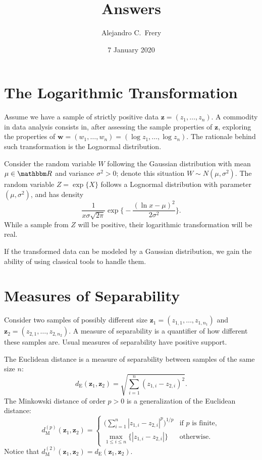 \documentclass[12pt]{article}
\title{Answers}
\author{Alejandro C.\ Frery}
\date{7 January 2020}
\begin{document}
\maketitle

\section{The Logarithmic Transformation}

Assume we have a sample of strictly positive data $\bm z=(z_1,\dots,z_n)$.
A commodity in data analysis consists in, after assessing the sample properties of $\bm z$, exploring the properties of $\bm w = (w_1,\dots,w_n)=(\log z_1,\dots,\log z_n)$.
The rationale behind such transformation is the Lognormal distribution.

Consider the random variable $W$ following the Gaussian distribution with mean $\mu\in\mathbbm R$ and variance $\sigma^2>0$; denote this situation $W\sim N(\mu,\sigma^2)$.
The random variable $Z=\exp \{X\}$ follows a Lognormal distribution with parameter $(\mu,\sigma^2)$, and has density
\begin{equation}
\frac {1}{x\sigma {\sqrt {2\pi }}}
 \exp \Big\{-\frac {\left(\ln x-\mu \right)^{2}}{2\sigma ^{2}}\Big\}.
\label{eq:densLognormal}
\end{equation}
While a sample from $Z$ will be positive, their logarithmic transformation will be real.

If the transformed data can be modeled by a Gaussian distribution, we gain the ability of using classical tools to handle them.

\section{Measures of Separability}

Consider two samples of possibly different size $\bm z_1=(z_{1,1},\dots,z_{1,n_1})$ and $\bm z_2=(z_{2,1},\dots,z_{2,n_2})$.
A measure of separability is a quantifier of how different these samples are.
Usual measures of separability have positive support.

The Euclidean distance is a measure of separability between samples of the same size $n$:
$$
d_{\text{E}}(\bm z_1, \bm z_2) = \sqrt{\sum_{i=1}^{n} (z_{1,i}-z_{2,i})^2}.
$$
The Minkowski distance of order $p>0$ is a generalization of the Euclidean distance:
$$
d_{\text{M}}^{(p)}(\bm z_1, \bm z_2) = 
	\begin{cases}
		\big(\sum_{i=1}^{n} |z_{1,i}-z_{2,i}|^p\big)^{1/p} & \text{if }p\text{ is finite}, \\
		\max_{1\leq i\leq n}\big\{ |z_{1,i}-z_{2,i}| \big\} & \text{otherwise}.
	\end{cases}
$$
Notice that $d_{\text{M}}^{(2)}(\bm z_1, \bm z_2)=d_{\text{E}}(\bm z_1, \bm z_2) $.
\end{document}
